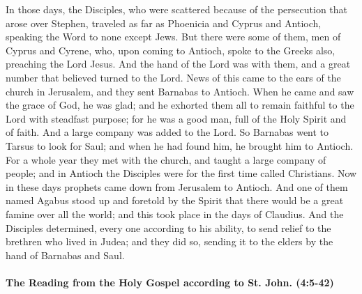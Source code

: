 \documentclass[twoside, letterpaper, 12pt]{report}
\begin{document}
\begin{maybetwocolumns}
  In those days, the Disciples, who were scattered because of the persecution that arose over
  Stephen, traveled as far as Phoenicia and Cyprus and Antioch, speaking the Word to none except
  Jews. But there were some of them, men of Cyprus and Cyrene, who, upon coming to Antioch,
  spoke to the Greeks also, preaching the Lord Jesus. And the hand of the Lord was with them, and
  a great number that believed turned to the Lord. News of this came to the ears of the church in
  Jerusalem, and they sent Barnabas to Antioch. When he came and saw the grace of God, he was
  glad; and he exhorted them all to remain faithful to the Lord with steadfast purpose; for he was a
  good man, full of the Holy Spirit and of faith. And a large company was added to the Lord. So
  Barnabas went to Tarsus to look for Saul; and when he had found him, he brought him to Antioch.
  For a whole year they met with the church, and taught a large company of people; and in Antioch
  the Disciples were for the first time called Christians. Now in these days prophets came down from
  Jerusalem to Antioch. And one of them named Agabus stood up and foretold by the Spirit that
  there would be a great famine over all the world; and this took place in the days of Claudius. And
  the Disciples determined, every one according to his ability, to send relief to the brethren who
  lived in Judea; and they did so, sending it to the elders by the hand of Barnabas and Saul.
\end{maybetwocolumns}



\paragraph{The Reading from the Holy Gospel according to St. John. (4:5-42)}\mbox{}\\
\end{document}
